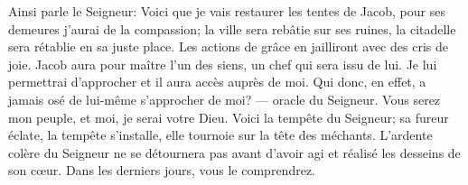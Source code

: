 Ainsi parle le Seigneur:
	Voici que je vais restaurer les tentes de Jacob,
	pour ses demeures j’aurai de la compassion;
	la ville sera rebâtie sur ses ruines, la citadelle sera rétablie en sa juste place.
Les actions de grâce en jailliront avec des cris de joie. 
Jacob aura pour maître l’un des siens, un chef qui sera issu de lui.
	Je lui permettrai d’approcher et il aura accès auprès de moi.
Qui donc, en effet, a jamais osé de lui-même s’approcher de moi?
	--- oracle du Seigneur.
Vous serez mon peuple, et moi, je serai votre Dieu.
Voici la tempête du Seigneur;
	sa fureur éclate, la tempête s’installe, elle tournoie sur la tête des méchants.
L’ardente colère du Seigneur ne se détournera pas avant d’avoir agi
	et réalisé les desseins de son cœur.
	Dans les derniers jours, vous le comprendrez.
